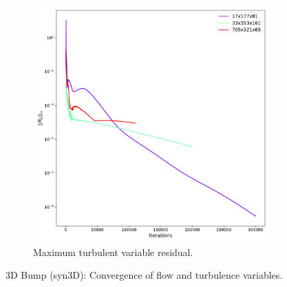 \begin{figure}[ht!]
\begin{subfigure}{.45\textwidth}
  \includegraphics[width=1.0\textwidth]{figs/3dbump/convergencesa.pdf}
  \caption{Maximum turbulent variable residual.}
\end{subfigure}
\caption{3D Bump (syn3D): Convergence of flow and turbulence variables.}
\label{fig:syn3dbumpcnv}
\end{figure}

